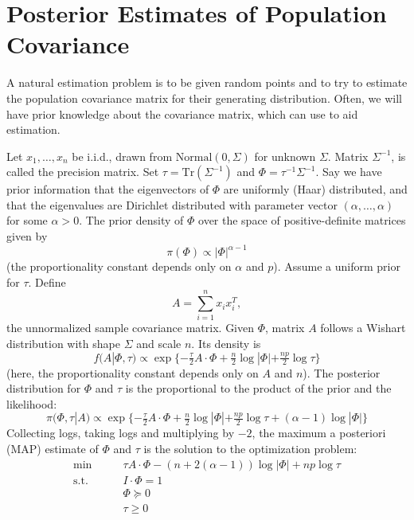 \documentclass{article}
\begin{document}
\section{Posterior Estimates of Population Covariance}

A natural estimation problem is to be given random points
and to try to estimate the population covariance matrix for their
generating distribution.  Often, we will have prior knowledge about
the covariance matrix, which can use to aid estimation.

Let $x_1, \ldots, x_n$ be i.i.d., drawn from $\mathrm{Normal}(0, \Sigma)$
for unknown $\Sigma$.  Matrix $\Sigma^{-1}$, is called the precision
matrix.  Set $\tau = \mathrm{Tr}(\Sigma^{-1})$ and
$\Phi = \tau^{-1} \Sigma^{-1}$.  Say we have prior information that the
eigenvectors of $\Phi$ are uniformly (Haar) distributed, and that the
eigenvalues are Dirichlet distributed with parameter vector
$(\alpha, \ldots, \alpha)$ for some $\alpha > 0$.  The prior density
of $\Phi$ over the space of positive-definite matrices given by
\[
    \pi(\Phi) \propto |\Phi|^{\alpha-1}
\]
(the proportionality constant depends only on $\alpha$ and $p$).
Assume a uniform prior for $\tau$.
Define
\[
    A = \sum_{i=1}^n x_i x_i^T,
\]
the unnormalized sample covariance matrix.  Given $\Phi$, matrix $A$
follows a Wishart distribution with shape $\Sigma$ and scale $n$.  Its
density is
\[
    f(A | \Phi, \tau)
        \propto
        \exp\{
            -\tfrac{\tau}{2} A \cdot \Phi
            + \tfrac{n}{2} \log | \Phi| + \tfrac{np}{2} \log \tau
        \}
\]
(here, the proportionality constant depends only on $A$ and $n$).  The
posterior distribution for $\Phi$ and $\tau$ is the proportional to the
product of the prior and the likelihood:
\[
    \pi(\Phi, \tau | A)
        \propto
        \exp\{
            -\tfrac{\tau}{2} A \cdot \Phi
            + \tfrac{n}{2} \log | \Phi| + \tfrac{np}{2} \log \tau
            +
            (\alpha - 1)
            \log |\Phi|
        \}
\]
Collecting logs, taking logs and multiplying by $-2$, the maximum a
posteriori (MAP) estimate of $\Phi$ and $\tau$ is the solution to the
optimization problem:
\begin{align*}
    \min \qquad &\tau A \cdot \Phi - (n + 2 (\alpha - 1)) \log |\Phi| + np \log \tau \\
    \text{s.t.} \qquad & I \cdot \Phi = 1 \\
    \phantom{\text{s.t.}} \qquad & \Phi \succeq 0 \\
    \phantom{\text{s.t.}} \qquad & \tau \geq 0
\end{align*}
\end{document}
